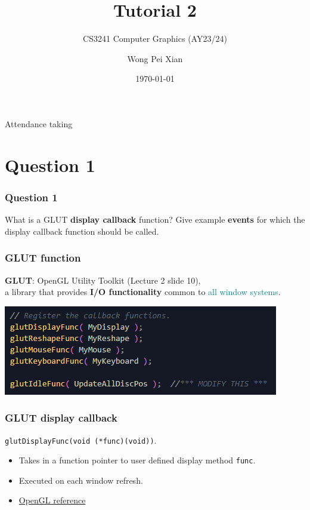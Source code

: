 \documentclass{beamer}
\title{Tutorial 2}
\subtitle{CS3241 Computer Graphics (AY23/24)}
\date{\today}
\author{Wong Pei Xian}
\institute[]{\email{e0389023@u.nus.edu}}
\begin{document}
\frame[plain]{\titlepage}

\begin{frame}
    \AlegreyaExtraBold \LARGE
    Attendance taking
\end{frame}

\section{Question 1}

\begin{frame}
    \frametitle{Question 1}
    What is a GLUT \textbf{display callback} function?  
    Give example \textbf{events} for which the display callback function should be called.
\end{frame}

\begin{frame}
    \frametitle{GLUT function}

    \begin{tcolorbox}
        \textbf{GLUT}: OpenGL Utility Toolkit (Lecture 2 slide 10), \\
        
        a library that provides \textbf{I/O functionality} common to \textcolor{teal}{all window systems}.
    \end{tcolorbox}

    \begin{center}
        \includegraphics[]{q1-glut-callbacks.png}
    \end{center}

\end{frame}

\begin{frame}
    \frametitle{GLUT display callback}

    \begin{tcolorbox}
        \centering
        \texttt{glutDisplayFunc(void (*func)(void))}.
    \end{tcolorbox}

    \begin{itemize}
        \item Takes in a function pointer to user defined display method \texttt{func}.
        \item Executed on each window refresh.
        \item \href{https://www.opengl.org/resources/libraries/glut/spec3/node46.html}{OpenGL reference}
    \end{itemize}

\end{frame}
\end{document}
